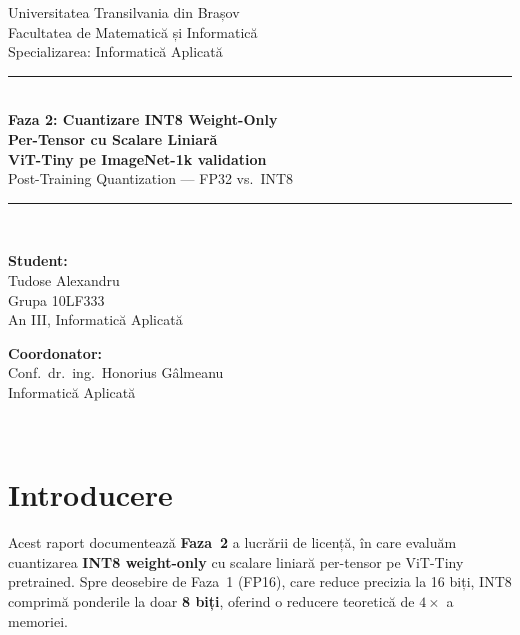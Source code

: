 \documentclass[12pt,a4paper]{article}
\begin{document}

\begin{titlepage}
  \centering
  {\large Universitatea Transilvania din Brașov\\}
  {\small Facultatea de Matematică și Informatică\\}
  {\small Specializarea: Informatică Aplicată\\[2cm]}

  \rule{\linewidth}{0.4pt}\\[0.5cm]
  {\LARGE\bfseries Faza 2: Cuantizare INT8 Weight-Only\\[0.3cm]}
  {\Large\bfseries Per-Tensor cu Scalare Liniară\\[0.2cm]}
  {\Large\bfseries ViT-Tiny pe ImageNet-1k validation\\[0.2cm]}
  {\large Post-Training Quantization --- FP32 vs.\ INT8}\\[0.3cm]
  \rule{\linewidth}{0.4pt}\\[2cm]

  \begin{minipage}{0.45\textwidth}
    \textbf{Student:}\\
    Tudose Alexandru\\
    Grupa 10LF333\\
    An III, Informatică Aplicată
  \end{minipage}
  \hfill
  \begin{minipage}{0.45\textwidth}
    \raggedleft
    \textbf{Coordonator:}\\
    Conf.\ dr.\ ing.\ Honorius Gâlmeanu\\
    Informatică Aplicată
  \end{minipage}\\[3cm]

\end{titlepage}

\tableofcontents
\newpage

\section{Introducere}

Acest raport documentează \textbf{Faza~2} a lucrării de licență, în care
evaluăm cuantizarea \textbf{INT8 weight-only} cu scalare liniară per-tensor
pe ViT-Tiny pretrained. Spre deosebire de Faza~1 (FP16), care reduce
precizia la 16 biți, INT8 comprimă ponderile la doar \textbf{8 biți},
oferind o reducere teoretică de $4\times$ a memoriei.
\end{document}
